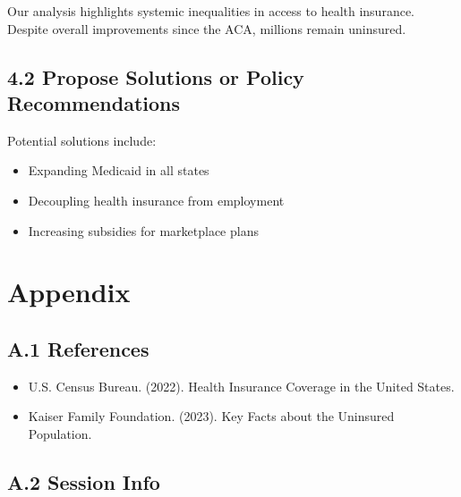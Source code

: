 \documentclass[
]{article}
\providecommand{\tightlist}{%
  \setlength{\itemsep}{0pt}\setlength{\parskip}{0pt}}
\begin{document}
Our analysis highlights systemic inequalities in access to health
insurance. Despite overall improvements since the ACA, millions remain
uninsured.

\subsection{4.2 Propose Solutions or Policy
Recommendations}\label{propose-solutions-or-policy-recommendations}

Potential solutions include:

\begin{itemize}
\tightlist
\item
  Expanding Medicaid in all states
\item
  Decoupling health insurance from employment
\item
  Increasing subsidies for marketplace plans
\end{itemize}

\section{Appendix}\label{appendix}

\subsection{A.1 References}\label{a.1-references}

\begin{itemize}
\tightlist
\item
  U.S. Census Bureau. (2022). Health Insurance Coverage in the United
  States.
\item
  Kaiser Family Foundation. (2023). Key Facts about the Uninsured
  Population.
\end{itemize}

\subsection{A.2 Session Info}\label{a.2-session-info}
\end{document}
